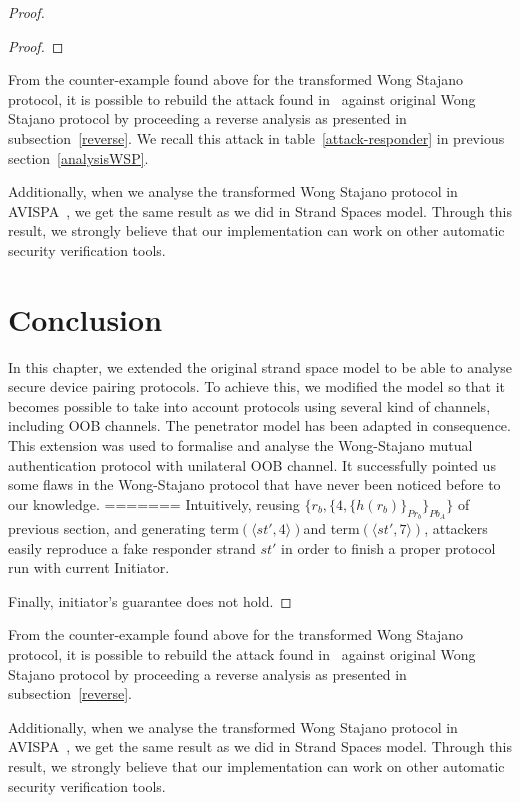 \begin{Definition}
\begin{table}[b]
\begin{proof}
\begin{proof}
\end{proof}

From the counter-example found above for the transformed Wong Stajano protocol, it is possible to rebuild the attack found in~\cite{ttnguyen} against original Wong Stajano protocol by proceeding a reverse analysis as presented in subsection~\ref{reverse}. We recall this attack in table~\ref{attack-responder} in previous section~\ref{analysisWSP}.

Additionally, when we analyse the transformed Wong Stajano protocol in AVISPA~\cite{Armando:2005:ATA:2153230.2153265}, we get the same result as we did in Strand Spaces model. Through this result, we strongly believe that our implementation can work on other automatic security verification tools. 


\section{Conclusion}

In this chapter, we extended the original strand space model to be able to analyse secure device pairing protocols. To achieve this, we modified the model so that it becomes possible to take into account protocols using several kind of channels, including OOB channels. The penetrator model has been adapted in consequence. This extension was used to formalise and analyse the Wong-Stajano mutual authentication protocol with unilateral OOB channel. It successfully pointed us some flaws in the Wong-Stajano protocol that have never been noticed before to our knowledge. 
=======
Intuitively, reusing $\{r_b, \{4,\{h(r_b)\}_{Pr_b}\}_{Pb_A}\}$ of previous section, and generating term$(\langle st',4 \rangle)$and term$(\langle st',7 \rangle)$, attackers easily reproduce a fake responder strand $st'$ in order to finish a proper protocol run with current Initiator. 

Finally, initiator's guarantee does not hold.  

\end{proof}

From the counter-example found above for the transformed Wong Stajano protocol, it is possible to rebuild the attack found in~\cite{ttnguyen} against original Wong Stajano protocol by proceeding a reverse analysis as presented in subsection~\ref{reverse}. 

Additionally, when we analyse the transformed Wong Stajano protocol in AVISPA~\cite{Armando:2005:ATA:2153230.2153265}, we get the same result as we did in Strand Spaces model. Through this result, we strongly believe that our implementation can work on other automatic security verification tools. 


\end{table}
\end{Definition}
